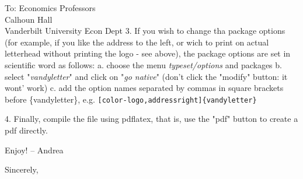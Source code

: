 \documentclass{letter}
\begin{document}
\begin{letter}{
To: Economics Professors\\
Calhoun Hall \\
Vanderbilt University Econ Dept}
3. If you wish to change tha package options (for example, if you like the
address to the left, or wich to print on actual letterhead without printing
the logo - see above), the package options are set in scientific word as
follows: \newline
a. choose the menu \emph{typeset/options} and packages\newline
b. select "\emph{vandyletter}" and click on "\emph{go native}" (don't click
the "modify" button: it wont' work)\newline
c. add the option names separated by commas in square brackets before
\{vandyletter\}, e.g.\newline
\texttt{[color-logo,addressright]\{vandyletter\}}

4. Finally, compile the file using pdflatex, that is, use the "pdf" button
to create a pdf directly.

Enjoy! -- Andrea

\closing{
Sincerely,
}

\end{letter}
\end{document}

